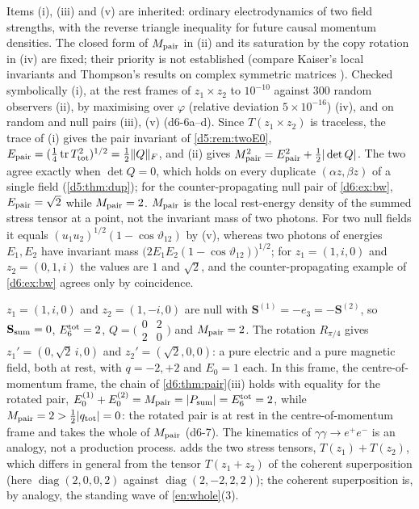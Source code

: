 Items (i), (iii) and (v) are inherited: ordinary electrodynamics of two field strengths, with the reverse triangle inequality for future
causal momentum densities. The closed form of $M_{\rm pair}$ in (ii) and its saturation by the copy rotation in (iv) are fixed; their priority is
not established (compare Kaiser's local invariants \cite{Kaiser11} and Thompson's results on complex symmetric matrices \cite{Thompson79}). Checked symbolically (i), at the rest frames of $z_1\times z_2$ to $10^{-10}$ against $300$ random
observers (ii), by maximising over $\varphi$ (relative deviation $5\times10^{-16}$) (iv), and on random and null pairs (iii), (v) (d6-6a--d).
Since $T(z_1\times z_2)$ is traceless, the trace of (i) gives the pair invariant of \cref{d5:rem:twoE0},
$E_{\rm pair}=(\tfrac14\operatorname{tr} T_{\rm tot}^2)^{1/2}=\tfrac12\|Q\|_F$, and (ii) gives $M_{\rm pair}^2=E_{\rm pair}^2+\tfrac12|\det Q|$. The two agree exactly when
$\det Q=0$, which holds on every duplicate $(\alpha z,\beta z)$ of a single field (\cref{d5:thm:dup}); for the counter-propagating null pair of
\cref{d6:ex:bw}, $E_{\rm pair}=\sqrt2$ while $M_{\rm pair}=2$. $M_{\rm pair}$ is the local rest-energy density of the summed stress tensor at a point,
not the invariant mass of two photons. For two null fields it equals $(u_1u_2)^{1/2}(1-\cos\vartheta_{12})$ by (v), whereas two photons of
energies $E_1,E_2$ have invariant mass $\bigl(2E_1E_2(1-\cos\vartheta_{12})\bigr)^{1/2}$; for $z_1=(1,i,0)$ and $z_2=(0,1,i)$ the values are $1$ and
$\sqrt2$, and the counter-propagating example of \cref{d6:ex:bw} agrees only by coincidence.

\begin{example}
\label{d6:ex:bw}
$z_1=(1,i,0)$ and $z_2=(1,-i,0)$ are null with $\mathbf S^{(1)}=-e_3=-\mathbf S^{(2)}$, so $\mathbf S_{\rm sum}=0$, $E_6^{\rm tot}=2$,
$Q=\bigl(\begin{smallmatrix}0&2\\2&0\end{smallmatrix}\bigr)$ and $M_{\rm pair}=2$. The rotation $R_{\pi/4}$ gives $z_1'=(0,\sqrt2\,i,0)$ and
$z_2'=(\sqrt2,0,0)$: a pure electric and a pure magnetic field, both at rest, with $q=-2,+2$ and $E_0=1$ each. In this frame, the centre-of-momentum frame, the chain of
\cref{d6:thm:pair}(iii) holds with equality for the rotated pair, $E_0^{(1)}+E_0^{(2)}=M_{\rm pair}=|P_{\rm sum}|=E_6^{\rm tot}=2$, while
$M_{\rm pair}=2>\tfrac12|q_{\rm tot}|=0$: the rotated pair is at rest in the centre-of-momentum frame and takes the whole of $M_{\rm pair}$ (d6-7).
The kinematics of $\gamma\gamma\to e^+e^-$ \cite{BreitWheeler34} is an analogy, not a production process.  adds the two stress
tensors, $T(z_1)+T(z_2)$, which differs in general from the tensor $T(z_1+z_2)$ of the coherent superposition (here $\operatorname{diag}(2,0,0,2)$ against
$\operatorname{diag}(2,-2,2,2)$); the coherent superposition is, by analogy, the standing
wave of
\cref{en:whole}(3).
\end{example}

